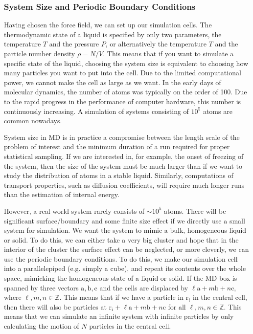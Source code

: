 \documentclass{article}
\theoremstyle{plain}\theoremheaderfont{\normalfont\itshape}\theorembodyfont{\rmfamily}\theoremseparator{.}\newtheorem*{rem}{Remark}\newtheorem*{ex}{Example}\newtheorem*{proof}{Proof}\newtheorem*{altp}{Alternative proof}
\theoremstyle{plain}\theoremheaderfont{\normalfont\bfseries}\theorembodyfont{\rmfamily}\theoremseparator{.}\newtheorem{thm}{Theorem}[section]\newtheorem{lem}[thm]{Lemma}\newtheorem{prop}[thm]{Proposition}\newtheorem*{cor}{Corollary}\newtheorem{defn}[thm]{Definition}\newtheorem{clm}[thm]{Claim}\newtheorem{clminproof}{Claim}\newtheorem{alg}[thm]{Algorithm}\newtheorem{hyp}[thm]{Hypothesis}\newtheorem{law}[thm]{Law}
\theoremstyle{break}\theoremheaderfont{\normalfont\itshape}\theorembodyfont{\rmfamily}\theoremseparator{.\medskip}\newtheorem*{proofskip}{Proof}\newtheorem*{exs}{Examples}\newtheorem*{rems}{Remarks}
\theoremstyle{break}\theoremheaderfont{\normalfont\bfseries}\theorembodyfont{\rmfamily}\theoremseparator{.\medskip}\newtheorem{lemskip}[thm]{Lemma}\newtheorem{defnskip}[thm]{Definition}\newtheorem{propskip}[thm]{Proposition}\newtheorem{thmskip}[thm]{Theorem}
\numberwithin{equation}{section}
\newcommand{\vb}[1]{\bm{\mathrm{#1}}}
\newcommand{\ZZ}{\mathbb{Z}}
\begin{document}
    \subsubsection{System Size and Periodic Boundary Conditions}
    Having chosen the force field, we can set up our simulation cells. The thermodynamic state of a liquid is specified by only two parameters, the temperature \(T\) and the pressure \(P\), or alternatively the temperature \(T\) and the particle number density \(\rho=N/V\). This means that if you want to simulate a specific state of the liquid, choosing the system size is equivalent to choosing how many particles you want to put into the cell. Due to the limited computational power, we cannot make the cell as large as we want. In the early days of molecular dynamics, the number of atoms was typically on the order of 100. Due to the rapid progress in the performance of computer hardware, this number is continuously increasing. A simulation of systems consisting of \(10^5\) atoms are common nowadays.

    System size in MD is in practice a compromise between the length scale of the problem of interest and the minimum duration of a run required for proper statistical sampling. If we are interested in, for example, the onset of freezing of the system, then the size of the system must be much larger than if we want to study the distribution of atoms in a stable liquid. Similarly, computations of transport properties, such as diffusion coefficients, will require much longer runs than the estimation of internal energy.

    However, a real world system rarely consists of \(\sim 10^5\) atoms. There will be significant surface/boundary and some finite size effect if we directly use a small system for simulation. We want the system to mimic a bulk, homogeneous liquid or solid. To do this, we can either take a very big cluster and hope that in the interior of the cluster the surface effect can be neglected, or more cleverly, we can use the periodic boundary conditions. To do this, we make our simulation cell into a parallelepiped (e.g. simply a cube), and repeat its contents over the whole space, mimicking the homogeneous state of a liquid or solid. If the MD box is spanned by three vectors \(\vb{a},\vb{b},\vb{c}\) and the cells are displaced by \(\ell\vb{a}+m\vb{b}+n\vb{c}\), where \(\ell,m,n\in\ZZ\). This means that if we have a particle in \(\vb{r}_i\) in the central cell, then there will also be particles at \(\vb{r}_i+\ell\vb{a}+m\vb{b}+n\vb{c}\) for all \(\ell,m,n\in\ZZ\). This means that we can simulate an infinite system with infinite particles by only calculating the motion of \(N\) particles in the central cell.
\end{document}
